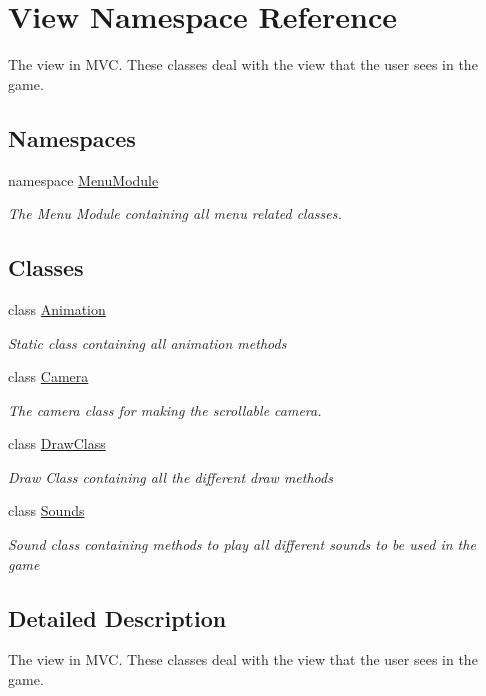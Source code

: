\hypertarget{namespace_view}{}\section{View Namespace Reference}
\label{namespace_view}


The view in M\+VC. These classes deal with the view that the user sees in the game.  


\subsection*{Namespaces}
\begin{DoxyCompactItemize}
\item 
namespace \hyperlink{namespace_view_1_1_menu_module}{Menu\+Module}
\begin{DoxyCompactList}\small\item\em The Menu Module containing all menu related classes. \end{DoxyCompactList}\end{DoxyCompactItemize}
\subsection*{Classes}
\begin{DoxyCompactItemize}
\item 
class \hyperlink{class_view_1_1_animation}{Animation}
\begin{DoxyCompactList}\small\item\em Static class containing all animation methods \end{DoxyCompactList}\item 
class \hyperlink{class_view_1_1_camera}{Camera}
\begin{DoxyCompactList}\small\item\em The camera class for making the scrollable camera. \end{DoxyCompactList}\item 
class \hyperlink{class_view_1_1_draw_class}{Draw\+Class}
\begin{DoxyCompactList}\small\item\em Draw Class containing all the different draw methods \end{DoxyCompactList}\item 
class \hyperlink{class_view_1_1_sounds}{Sounds}
\begin{DoxyCompactList}\small\item\em Sound class containing methods to play all different sounds to be used in the game \end{DoxyCompactList}\end{DoxyCompactItemize}


\subsection{Detailed Description}
The view in M\+VC. These classes deal with the view that the user sees in the game. 

